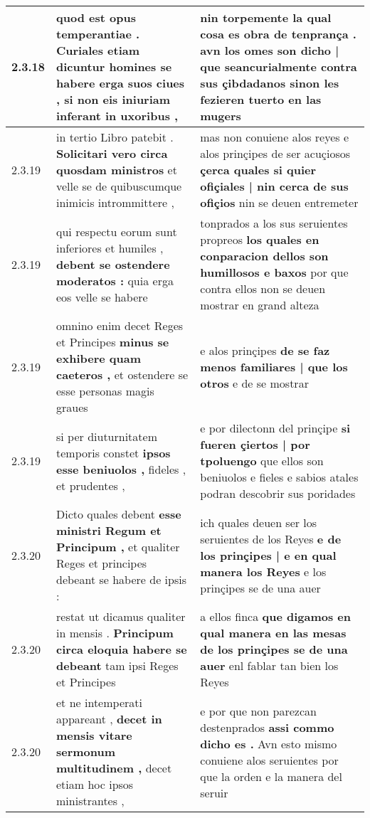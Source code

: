 \begin{tabular}{|p{1cm}|p{6.5cm}|p{6.5cm}|}
2.3.18 & quod est opus temperantiae . \textbf{ Curiales etiam dicuntur homines se habere erga suos ciues , } si non eis iniuriam inferant in uxoribus , & nin torpemente la qual cosa es obra de tenprança . \textbf{ avn los omes son dicho | que } seancurialmente contra sus çibdadanos sinon les fezieren tuerto en las mugers \\\hline
2.3.19 & in tertio Libro patebit . \textbf{ Solicitari vero circa quosdam ministros } et velle se de quibuscumque inimicis intrommittere , & mas non conuiene alos reyes e alos prinçipes de ser acuçiosos \textbf{ çerca quales si quier ofiçiales | nin cerca de sus ofiçios } nin se deuen entremeter \\\hline
2.3.19 & qui respectu eorum sunt inferiores et humiles , \textbf{ debent se ostendere moderatos : } quia erga eos velle se habere & tonprados a los sus seruientes propreos \textbf{ los quales en conparacion dellos son humillosos e baxos } por que contra ellos non se deuen mostrar en grand alteza \\\hline
2.3.19 & omnino enim decet Reges et Principes \textbf{ minus se exhibere quam caeteros , } et ostendere se esse personas magis graues & e alos prinçipes \textbf{ de se faz menos familiares | que los otros } e de se mostrar \\\hline
2.3.19 & si per diuturnitatem temporis constet \textbf{ ipsos esse beniuolos , } fideles , et prudentes , & e por dilectonn del prinçipe \textbf{ si fueren çiertos | por tpoluengo } que ellos son beniuolos e fieles e sabios atales podran descobrir sus poridades \\\hline
2.3.20 & Dicto quales debent \textbf{ esse ministri Regum et Principum , } et qualiter Reges et principes debeant se habere de ipsis : & ich quales deuen ser los seruientes de los Reyes \textbf{ e de los prinçipes | e en qual manera los Reyes } e los prinçipes se de una auer \\\hline
2.3.20 & restat ut dicamus qualiter in mensis . \textbf{ Principum circa eloquia habere se debeant } tam ipsi Reges et Principes & a ellos finca \textbf{ que digamos en qual manera en las mesas de los prinçipes se de una auer } enl fablar tan bien los Reyes \\\hline
2.3.20 & et ne intemperati appareant , \textbf{ decet in mensis vitare sermonum multitudinem , } decet etiam hoc ipsos ministrantes , & e por que non parezcan destenprados \textbf{ assi commo dicho es . } Avn esto mismo conuiene alos seruientes por que la orden e la manera del seruir \\\hline

\end{tabular}
